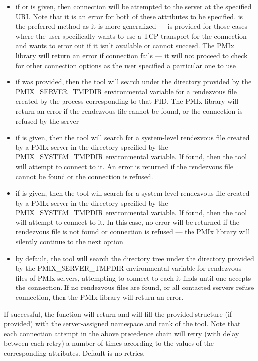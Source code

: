 \begin{itemize}
    \item if  or  is given, then connection will be attempted to the server at the specified \ac{URI}. Note that it is an error for both of these attributes to be specified.  is the preferred method as it is more generalized ---  is provided for those cases where the user specifically wants to use a TCP transport for the connection and wants to error out if it isn't available or cannot succeed. The \ac{PMIx} library will return an error if connection fails --- it will not proceed to check for other connection options as the user specified a particular one to use
    \item if  was provided, then the tool will search under the directory provided by the PMIX\_SERVER\_TMPDIR environmental variable for a rendezvous file created by the process corresponding to that \ac{PID}. The \ac{PMIx} library will return an error if the rendezvous file cannot be found, or the connection is refused by the server
    \item if  is given, then the tool will search for a system-level rendezvous file created by a \ac{PMIx} server in the directory specified by the PMIX\_SYSTEM\_TMPDIR environmental variable. If found, then the tool will attempt to connect to it. An error is returned if the rendezvous file cannot be found or the connection is refused.
    \item if  is given, then the tool will search for a system-level rendezvous file created by a \ac{PMIx} server in the directory specified by the PMIX\_SYSTEM\_TMPDIR environmental variable. If found, then the tool will attempt to connect to it. In this case, no error will be returned if the rendezvous file is not found or connection is refused --- the \ac{PMIx} library will silently continue to the next option
    \item by default, the tool will search the directory tree under the directory provided by the PMIX\_SERVER\_TMPDIR environmental variable for rendezvous files of \ac{PMIx} servers, attempting to connect to each it finds until one accepts the connection. If no rendezvous files are found, or all contacted servers refuse connection, then the \ac{PMIx} library will return an error.
\end{itemize}

If successful, the function will return  and will fill the provided structure (if provided) with the server-assigned namespace and rank of the tool. Note that each connection attempt in the above precedence chain will retry (with delay between each retry) a number of times according to the values of the corresponding attributes. Default is no retries.

